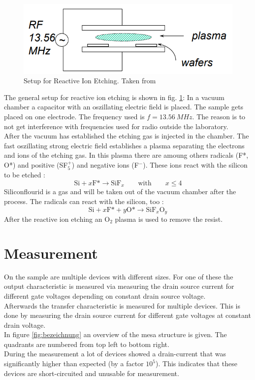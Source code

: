\documentclass[%
 reprint,
amsmath,amssymb,
pra,
]{revtex4-1}
\begin{document}
\begin{figure}
\centering
\includegraphics[scale=0.5]{Bilder/Reactive_Ion_Etching.PNG}
\caption{Setup for Reactive Ion Etching. Taken from \cite{Cheung}}
\label{fig:Reactive_Ion_Etching}
\end{figure}

The general setup for reactive ion etching is shown in fig. \ref{fig:Reactive_Ion_Etching}: In a vacuum chamber a capacitor with an oszillating electric field is placed. The sample gets placed on one electrode. The frequency used is $f = \SI{13.56}{MHz}$. The reason is to not get interference with frequencies used for radio outside the laboratory. \\
After the vacuum has established the etching gas is injected in the chamber. The fast oszillating strong electric field establishes a plasma separating the electrons and ions of the etching gas. In this plasma there are amoung others radicals (F*, O*) and positive (SF$_5^+$) and negative ions (F$^-$). These ions react with the silicon to be etched \cite{Jansen_1996}:
\begin{equation*}
\text{Si} + x \text{F*} \rightarrow \text{SiF}_x \qquad \text{with} \qquad x \leq 4
\end{equation*}
Siliconflourid is a gas and will be taken out of the vacuum chamber after the process. The radicals can react with the silicon, too \cite{Jansen_1996}: 
\begin{equation*}
\text{Si} + x \text{F*} + y \text{O*} \rightarrow \text{SiF}_x \text{O}_y
\end{equation*}
After the reactive ion etching an O$_2$ plasma is used to remove the resist.


\section{Measurement}
On the sample are multiple devices with different sizes. For one of these the output characteristic is measured via measuring the drain source current for different gate voltages depending on constant drain source voltage. \\
Afterwards the transfer characteristic is measured for multiple devices. This is done by measuring the drain source current for different gate voltages at constant drain voltage.\\
In figure \ref{fig:bezeichnung} an overview of the mesa structure is given. The quadrants are numbered from top left to bottom right.\\
During the measurement a lot of devices showed a drain-current that was significantly higher than expected (by a factor $10^5$). This indicates that these devices are short-circuited and unusable for measurement.
\end{document}

